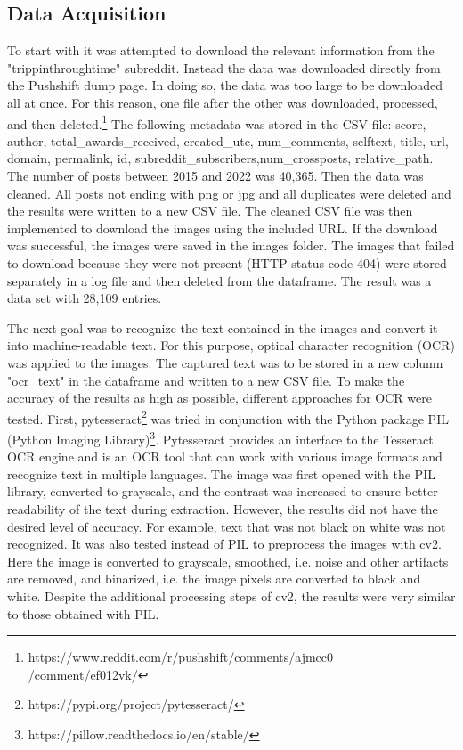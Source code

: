 \documentclass[11pt,a4paper]{article}
\begin{document}
 \subsection{Data Acquisition}
To start with it was attempted to download the relevant information from the "trippinthroughtime" subreddit. Instead the data was downloaded directly from the Pushshift dump page. In doing so, the data was too large to be downloaded all at once. For this reason, one file after the other was downloaded, processed, and then deleted.\footnote{https://www.reddit.com/r/pushshift/comments/ajmcc0\\/comment/ef012vk/}
The following metadata was stored in the CSV file: score, author, total\_awards\_received, created\_utc, num\_comments, selftext, title, url, domain, permalink, id, subreddit\_subscribers,num\_crossposts, relative\_path. The number of posts between 2015 and 2022 was 40,365.
Then the data was cleaned. All posts not ending with png or jpg and all duplicates were deleted and the results were written to a new CSV file. The cleaned CSV file was then implemented to download the images using the included URL. If the download was successful, the images were saved in the images folder. The images that failed to download because they were not present (HTTP status code 404) were stored separately in a log file and then deleted from the dataframe. The result was a data set with 28,109 entries.
\par
The next goal was to recognize the text contained in the images and convert it into machine-readable text. For this purpose, optical character recognition (OCR) was applied to the images. The captured text was to be stored in a new column "ocr\_text" in the dataframe and written to a new CSV file. 
To make the accuracy of the results as high as possible, different approaches for OCR were tested. First, pytesseract\footnote{https://pypi.org/project/pytesseract/} was tried in conjunction with the Python package PIL (Python Imaging Library)\footnote{https://pillow.readthedocs.io/en/stable/}. Pytesseract provides an interface to the Tesseract OCR engine and is an OCR tool that can work with various image formats and recognize text in multiple languages.\cite{Imtiaz2020}
The image was first opened with the PIL library, converted to grayscale, and the contrast was increased to ensure better readability of the text during extraction. However, the results did not have the desired level of accuracy. For example, text that was not black on white was not recognized. 
It was also tested instead of PIL to preprocess the images with cv2. Here the image is converted to grayscale, smoothed, i.e. noise and other artifacts are removed, and binarized, i.e. the image pixels are converted to black and white. Despite the additional processing steps of cv2, the results were very similar to those obtained with PIL. 
\end{document}
